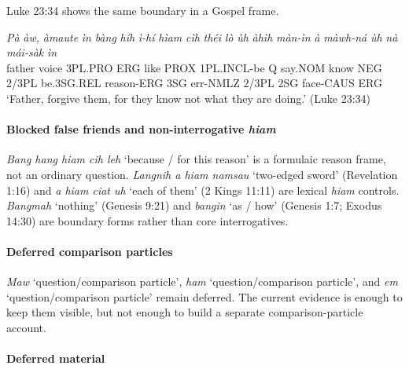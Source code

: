 \documentclass[
  11pt,
  a4paper,
]{article}
\newcommand{\tdim}[1]{\textit{#1}}
\newcommand{\tdimword}[1]{\textit{#1}}
\renewcommand{\textsc}[1]{{\footnotesize\MakeUppercase{#1}}}
\newcommand{\glossquote}[1]{`#1'}
\begin{document}
Luke 23:34 shows the same boundary in a Gospel frame.

\begin{exe}
\ex \label{ex:int-embedded-luke23-34}
\gll \tdimword{Pà} \tdimword{àw,} \tdimword{àmaute} \tdimword{ìn} \tdimword{bàng} \tdimword{híh} \tdimword{ì-hí} \tdimword{hìam} \tdimword{cìh} \tdimword{théi} \tdimword{lò} \tdimword{ùh} \tdimword{àhìh} \tdimword{màn-ìn} \tdimword{à} \tdimword{màwh-ná} \tdimword{ùh} \tdimword{nà} \tdimword{mái-sàk} \tdimword{ìn} \\
     father voice \textsc{3pl}.\textsc{pro} \textsc{erg} like \textsc{prox} \textsc{1pl}.\textsc{incl}-be \textsc{q} say.\textsc{nom} know \textsc{neg} 2/3PL be.\textsc{3sg}.\textsc{rel} reason-\textsc{erg} \textsc{3sg} err-\textsc{nmlz} 2/3PL \textsc{2sg} face-\textsc{caus} \textsc{erg} \\
\glt \glossquote{Father, forgive them, for they know not what they are doing.} (Luke 23:34)
\end{exe}

\paragraph{\texorpdfstring{Blocked false friends and non-interrogative
\tdim{hiam}}{Blocked false friends and non-interrogative }}\label{blocked-false-friends-and-non-interrogative}

\tdim{Bang hang hiam cih leh} \glossquote{because / for this reason} is
a formulaic reason frame, not an ordinary question.
\tdim{Langnih a hiam namsau} \glossquote{two-edged sword} (Revelation
1:16) and \tdim{a hiam ciat uh} \glossquote{each of them} (2 Kings
11:11) are lexical \tdim{hiam} controls. \tdim{Bangmah}
\glossquote{nothing} (Genesis 9:21) and \tdim{bangin}
\glossquote{as / how} (Genesis 1:7; Exodus 14:30) are boundary forms
rather than core interrogatives.

\paragraph{Deferred comparison
particles}\label{deferred-comparison-particles}

\tdim{Maw} \glossquote{question/comparison particle}, \tdim{ham}
\glossquote{question/comparison particle}, and \tdim{em}
\glossquote{question/comparison particle} remain deferred. The current
evidence is enough to keep them visible, but not enough to build a
separate comparison-particle account.

\paragraph{Deferred material}\label{deferred-material-10}
\end{document}
